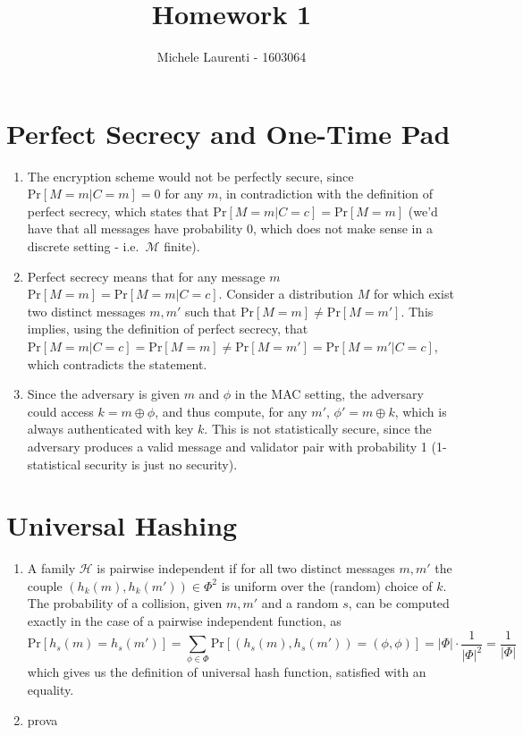 \documentclass{article}
\title{Homework 1}
\author{Michele Laurenti - 1603064}
\newcommand{\messages}{\mathcal{M}}
\newcommand{\hash}{\mathcal{H}}
\newcommand{\xor}{\oplus}
\renewcommand{\Pr}[1]{\ensuremath{\mathrm{Pr} \left[ {#1} \right]}}
\newcommand{\abs}[1]{\left| {#1} \right|}
\begin{document}
\maketitle

\section{Perfect Secrecy and One-Time Pad}

\begin{enumerate}
	\item The encryption scheme would not be perfectly secure, since $\Pr{M=m | C=m} = 0$ for any $m$, in contradiction with the definition of perfect secrecy, which states that $\Pr{M=m|C=c}=\Pr{M=m}$ (we'd have that all messages have probability 0, which does not make sense in a discrete setting - i.e.\ $\messages$ finite).

	\item Perfect secrecy means that for any message $m$ $\Pr{M=m} = \Pr{M=m|C=c}$.
		Consider a distribution $M$ for which exist two distinct messages $m, m'$ such that $\Pr{M=m} \neq \Pr{M=m'}$.
		This implies, using the definition of perfect secrecy, that $\Pr{M=m | C=c} = \Pr{M=m} \neq \Pr{M=m'} = \Pr{M=m' | C=c}$, which contradicts the statement.

	\item Since the adversary is given $m$ and $\phi$ in the MAC setting, the adversary could access $k = m \xor \phi$, and thus compute, for any $m'$, $\phi' = m \xor k$, which is always authenticated with key $k$.
		This is not statistically secure, since the adversary produces a valid message and validator pair with probability 1 (1-statistical security is just no security).
\end{enumerate}

\section{Universal Hashing}

\begin{enumerate}
	\item A family $\hash$ is pairwise independent if for all two distinct messages $m, m'$ the couple $(h_k(m), h_k(m')) \in \Phi^2$ is uniform over the (random) choice of $k$.
		The probability of a collision, given $m, m'$ and a random $s$, can be computed exactly in the case of a pairwise independent function, as
		\[
			\Pr{h_s(m) = h_s(m')} = \sum_{\phi \in \Phi} \Pr{(h_s(m), h_s(m')) = (\phi, \phi)} =
			\abs{\Phi} \cdot \frac{1}{\abs{\Phi}^2} = \frac{1}{\abs{\Phi}}
		\]
		which gives us the definition of universal hash function, satisfied with an equality.

	\item prova
\end{enumerate}
\end{document}

